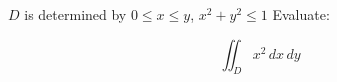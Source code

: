 \( D \) is determined by  \( 0 \leq x \leq y \), \( x^2 + y^2 \leq 1 \) Evaluate:

\[
\iint_D x^2 \, dx \, dy
\]
